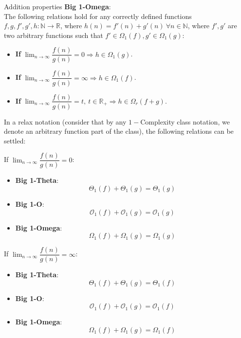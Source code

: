 \begin{theorem}
    Addition properties \textbf{Big 1-Omega}: \\
    The following relations hold for any correctly defined functions $f, g, f', g', h:\mathbb{N}\longrightarrow\mathbb{R}$, where $ h(n) = f'(n) + g'(n)\  \forall n \in \mathbb{N} $, where $f',g'$ are two arbitrary functions such that $ f' \in \Omega_{1}(f), g' \in \Omega_{1}(g) $:
    \begin{itemize}
        \item \textbf{If} $ \lim_{n\to\infty} \dfrac{f(n)}{g(n)} = 0 \Rightarrow  h \in \Omega_{1}(g) $.
        \item \textbf{If} $ \lim_{n\to\infty} \dfrac{f(n)}{g(n)} = \infty \Rightarrow  h \in \Omega_{1}(f) $.
        \item \textbf{If} $ \lim_{n\to\infty} \dfrac{f(n)}{g(n)} = t, \ t \in \mathbb{R}_{+} \Rightarrow  h \in \Omega_{r} \left( f + g \right) $.
    \end{itemize}

\end{theorem}


In a relax notation (consider that by any  $1-$Complexity class notation, we denote an arbitrary function part of the class), the following relations can be settled:

\begin{lemma}
    If $\lim_{n\to\infty} \dfrac{f(n)}{g(n)} = 0$:
    \begin{itemize}
        \item \textbf{Big 1-Theta}:
        \[  \Theta_{1}(f) + \Theta_{1}(g) = \Theta_{1}(g)\]
        \item \textbf{Big 1-O}:
        \[  \mathcal{O}_{1}(f) + \mathcal{O}_{1}(g) = \mathcal{O}_{1}(g)\]
        \item \textbf{Big 1-Omega}:
        \[  \Omega_{1}(f) + \Omega_{1}(g) = \Omega_{1}(g)\]
    \end{itemize}
\end{lemma}

\begin{lemma}
    If $\lim_{n\to\infty} \dfrac{f(n)}{g(n)} = \infty$:
    \begin{itemize}
        \item \textbf{Big 1-Theta}:
        \[  \Theta_{1}(f) + \Theta_{1}(g) = \Theta_{1}(f)\]
        \item \textbf{Big 1-O}:
        \[  \mathcal{O}_{1}(f) + \mathcal{O}_{1}(g) = \mathcal{O}_{1}(f)\]
        \item \textbf{Big 1-Omega}:
        \[  \Omega_{1}(f) + \Omega_{1}(g) = \Omega_{1}(f)\]
    \end{itemize}
\end{lemma}

